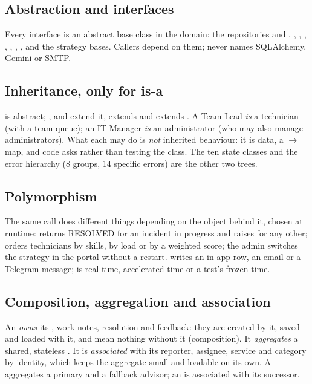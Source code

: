 \subsection*{Abstraction and interfaces}
Every interface is an abstract base class in the domain: the repositories and
, , , ,
, , , , and the
strategy bases. Callers depend on them;  never names SQLAlchemy, Gemini
or SMTP.

\subsection*{Inheritance, only for is-a}
 is abstract; ,  and  extend it,
 extends  and  extends . A Team
Lead \emph{is} a technician (with a team queue); an IT Manager \emph{is} an administrator (who may
also manage administrators). What each may do is \emph{not} inherited behaviour: it is data, a
 $\rightarrow$  map, and code asks
 rather than testing the class. The ten state classes and the error
hierarchy (8 groups, 14 specific errors) are the other two trees.

\subsection*{Polymorphism}
The same call does different things depending on the object behind it, chosen at runtime:
 returns RESOLVED for an incident in progress and raises for any other;
 orders technicians by skills, by load or by a weighted score; the admin
switches the strategy in the portal without a restart.  writes an in-app
row, an email or a Telegram message;  is real time, accelerated time or a
test's frozen time.

\subsection*{Composition, aggregation and association}
An  \emph{owns} its , work notes, resolution and feedback: they are
created by it, saved and loaded with it, and mean nothing without it (composition). It
\emph{aggregates} a shared, stateless . It is \emph{associated} with its
reporter, assignee, service and category by identity, which keeps the aggregate small and
loadable on its own. A  aggregates a primary and a fallback advisor; an
 is associated with its successor.

